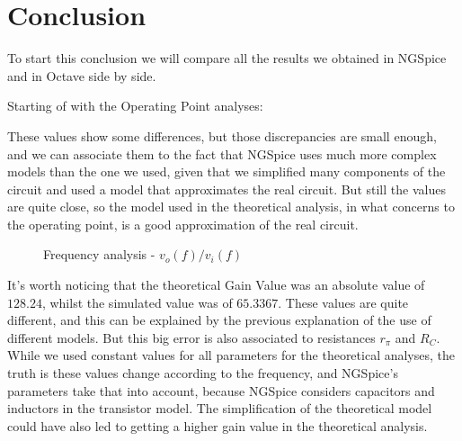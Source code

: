 \section{Conclusion}
\label{sec:conclusion}

To start this conclusion we will compare all the results we obtained in NGSpice and in Octave side by side. 

Starting of with the Operating Point analyses:

\FloatBarrier
\begin{table}[h]
	\centering
	\qquad
	\caption{Operating Point Analysis}
	\label{tab:conc1}
\end{table}
\FloatBarrier 

These values show some differences, but those discrepancies are small enough, and we can associate them to the fact that NGSpice uses much more complex models than the one we used, given that we simplified many components of the circuit and used a model that approximates the real circuit. But still the values are quite close, so the model used in the theoretical analysis, in what concerns to the operating point, is a good approximation of the real circuit.

\FloatBarrier
\begin{figure}[ht]
	\centering
	\qquad
	\caption{Frequency analysis - $v_o(f)/v_i(f)$}
	\label{fig:conc2}
\end{figure}
\FloatBarrier

It's worth noticing that the theoretical Gain Value was an absolute value of $128.24$, whilst the simulated value was of $65.3367$. These values are quite different, and this can be explained by the previous explanation of the use of different models. But this big error is also associated to resistances $r_\pi$ and $R_C$. While we used constant values for all parameters for the theoretical analyses, the truth is these values change according to the frequency, and NGSpice's parameters take that into account, because NGSpice considers capacitors and inductors in the transistor model. The simplification of the theoretical model could have also led to getting a higher gain value in the theoretical analysis.


